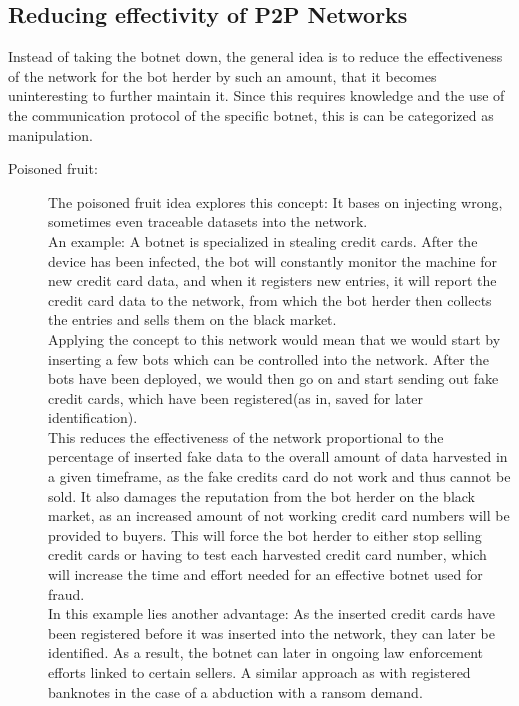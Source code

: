 \documentclass[10pt, a4paper, twocolumn]{article} %
\begin{document}
\subsection{Reducing effectivity of P2P Networks}
Instead of taking the botnet down, the general idea is to reduce the effectiveness of the network for the bot herder by such an amount, that it becomes uninteresting to further maintain it. Since this requires knowledge and the use of the communication protocol of the specific botnet, this is can be categorized as manipulation.\\ 
\begin{description}
\item[Poisoned fruit:] The poisoned fruit idea explores this concept: It bases on injecting wrong, sometimes even traceable datasets into the network.\\ 
An example: A botnet is specialized in stealing credit cards. After the device has been infected, the bot will constantly monitor the machine for new credit card data, and when it registers new entries, it will report the credit card data to the network, from which the bot herder then collects the entries and sells them on the black market.\\
Applying the concept to this network would mean that we would start by inserting a few bots which can be controlled into the network. After the bots have been deployed, we would then go on and start sending out fake credit cards, which have been registered(as in, saved for later identification). \\
This reduces the effectiveness of the network proportional to the percentage of inserted fake data to the overall amount of data harvested in a given timeframe, as the fake credits card do not work and thus cannot be sold. It also damages the reputation from the bot herder on the black market, as an increased amount of not working credit card numbers will be provided to buyers. This will force the bot herder to either stop selling credit cards or having to test each harvested credit card number, which will increase the time and effort needed for an effective botnet used for fraud. \\
In this example lies another advantage: As the inserted credit cards have been registered before it was inserted into the network, they can later be identified. As a result, the botnet can later in ongoing law enforcement efforts linked to certain sellers. A similar approach as with registered banknotes in the case of a abduction with a ransom demand.\\\\


\end{description}
\end{document}
